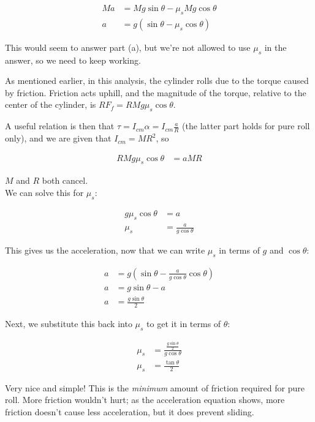 \documentclass[8.01x]{subfiles}
\begin{document}
\begin{align}
M a &= M g \sin \theta - \mu_s M g \cos \theta\\
a &= g (\sin \theta - \mu_s \cos \theta)
\end{align}

This would seem to answer part (a), but we're not allowed to use $\mu_s$ in the answer, so we need to keep working.

As mentioned earlier, in this analysis, the cylinder rolls due to the torque caused by friction. Friction acts uphill, and the magnitude of the torque, relative to the center of the cylinder, is $R F_f = R M g \mu_s \cos \theta$.

A useful relation is then that $\displaystyle \tau = I_{cm} \alpha = I_{cm} \frac{a}{R}$ (the latter part holds for pure roll only), and we are given that $I_{cm} = M R^2$, so

\begin{align}
R M g \mu_s \cos \theta &= a M R
\end{align}

$M$ and $R$ both cancel.\\
We can solve this for $\mu_s$:

\begin{align}
g \mu_s \cos \theta &= a\\
\mu_s &= \frac{a}{g \cos \theta}
\end{align}

This gives us the acceleration, now that we can write $\mu_s$ in terms of $g$ and $\cos \theta$:

\begin{align}
a &= g (\sin \theta - \frac{a}{g \cos \theta} \cos \theta)\\
a &= g \sin \theta - a\\
a &= \frac{g \sin \theta}{2}
\end{align}

Next, we substitute this back into $\mu_s$ to get it in terms of $\theta$:

\begin{align}
\mu_s &= \frac{\frac{g \sin \theta}{2}}{g \cos \theta}\\
\mu_s &= \frac{\tan \theta}{2}
\end{align}

Very nice and simple! This is the \emph{minimum} amount of friction required for pure roll. More friction wouldn't hurt; as the acceleration equation shows, more friction doesn't cause less acceleration, but it does prevent sliding.
\end{document}
